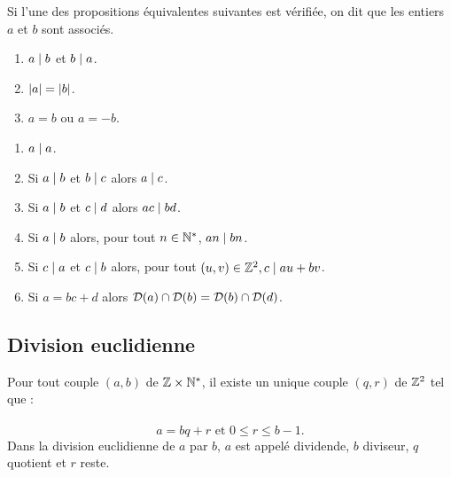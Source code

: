 \begin{defprop}
	Si l’une des propositions équivalentes suivantes est vérifiée, on dit que les entiers \(a\) et \(b\) sont associés.
	\begin{enumerate}
		\item \(a \mid b\) et \(b \mid a\).
		\item \(\left\lvert a\right\rvert = \left\lvert b\right\rvert\).
		\item \(a = b\) ou \(a = -b\).
	\end{enumerate}
\end{defprop}

\begin{defprop}
	\begin{enumerate}
		\item \(a \mid a\).
		\item Si \(a \mid b\) et \(b \mid c\) alors \(a \mid c\).
		\item Si \(a \mid b\) et \(c \mid d\) alors \(ac \mid bd\).
		\item Si \(a \mid b\) alors, pour tout \(n \in \mathbb{N}^*\), \(an\mid bn\).
		\item Si \(c \mid a\) et \(c \mid b \) alors, pour tout \( (u, v) \in\mathbb{Z}^2, c \mid au + bv\).
		\item Si \(a = bc + d\) alors \(\mathcal{D}(a) \cap \mathcal{D}(b) = \mathcal{D}(b) \cap \mathcal{D}(d)\).
	\end{enumerate}
\end{defprop}

\subsection{Division euclidienne}
\begin{theo}
	Pour tout couple \((a, b)\) de \(\mathbb{Z} \times \mathbb{N}^*\), il existe un unique couple \((q, r)\) de \(\mathbb{Z}^2\) tel que :\\~\\
	\[a = bq + r \text{ et } 0 \leq r \leq b - 1.\]
	Dans la division euclidienne de \(a\) par \(b\), \(a\) est appelé dividende, \(b\) diviseur, \(q\) quotient et \(r\) reste.
\end{theo}


